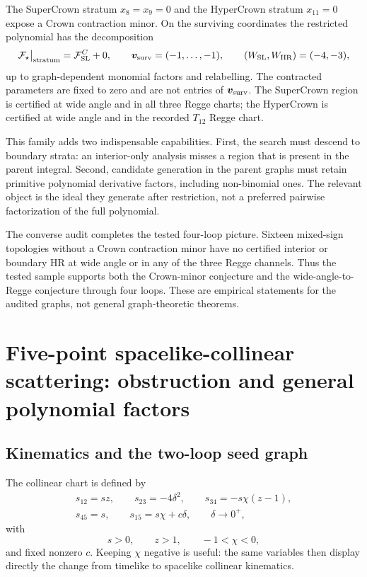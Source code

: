 \documentclass[a4paper,11pt]{article}
\newcommand{\FSL}{\mathcal F_{\rm SL}}
\newcommand{\WSL}{W_{\rm SL}}
\newcommand{\WHR}{W_{\rm HR}}
\begin{document}
The SuperCrown stratum \(x_8=x_9=0\) and the HyperCrown stratum
\(x_{11}=0\) expose a Crown contraction minor.  On the surviving coordinates
the restricted polynomial has the decomposition
\begin{equation}
 \mathcal F_\star\big|_{\rm stratum}
 =\FSL^{C}+0,
 \qquad
 \boldsymbol v_{\rm surv}=(-1,\ldots,-1),
 \qquad (\WSL,\WHR)=(-4,-3),
 \label{eq:crown-descendant-data}
\end{equation}
up to graph-dependent monomial factors and relabelling.  The contracted
parameters are fixed to zero and are not entries of
\(\boldsymbol v_{\rm surv}\).  The SuperCrown region is certified at wide
angle and in all three Regge charts; the HyperCrown is certified at wide
angle and in the recorded \(T_{12}\) Regge chart.

This family adds two indispensable capabilities.  First, the search must
descend to boundary strata: an interior-only analysis misses a region that
is present in the parent integral.  Second, candidate generation in the
parent graphs must retain primitive polynomial derivative factors, including
non-binomial ones.  The relevant object is the ideal they generate after
restriction, not a preferred pairwise factorization of the full polynomial.

The converse audit completes the tested four-loop picture.  Sixteen
mixed-sign topologies without a Crown contraction minor have no certified
interior or boundary HR at wide angle or in any of the three Regge channels.
Thus the tested sample supports both the Crown-minor conjecture and the
wide-angle-to-Regge conjecture through four loops.  These are empirical
statements for the audited graphs, not general graph-theoretic theorems.

\section{Five-point spacelike-collinear scattering: obstruction and general polynomial factors}
\label{sec:example-five-point}

\subsection{Kinematics and the two-loop seed graph}

The collinear chart is defined by
\begin{equation}
 \begin{gathered}
 s_{12}=sz,\qquad s_{23}=-4\delta^2,\qquad
 s_{34}=-s\chi(z-1),\\
 s_{45}=s,\qquad s_{15}=s\chi+c\delta,\qquad \delta\to0^+,
 \end{gathered}
 \label{eq:five-kinematics}
\end{equation}
with
\begin{equation}
 s>0,\qquad z>1,\qquad -1<\chi<0,
 \label{eq:five-domain}
\end{equation}
and fixed nonzero \(c\).  Keeping \(\chi\) negative is useful: the same
variables then display directly the change from timelike to spacelike
collinear kinematics.
\end{document}
